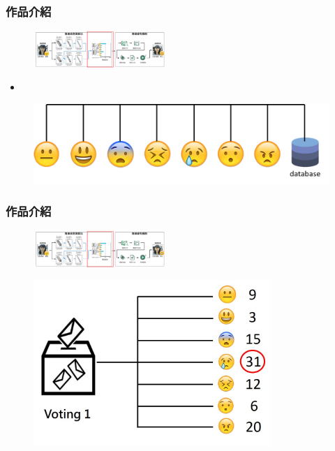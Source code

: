 \documentclass[10pt, conference, compsocconf]{beamer}
\begin{document}
\begin{CJK}{UTF8}{}
\begin{frame}
\frametitle{作品介紹}
\begin{figure}[t]
\begin{flushright}
\includegraphics[width=5cm]{./Figures/framework3.pdf}
\end{flushright}
\end{figure}

\vspace{-5mm}

\begin{itemize}
\item {}
\end{itemize}

\vspace{5mm}
\begin{figure}[!t]
\begin{center}
\includegraphics[width=12.3cm]{./Figures/501.png}
\end{center}
\end{figure}

\end{frame}

\begin{frame}
\frametitle{作品介紹}
\begin{figure}[t]
\begin{flushright}
\includegraphics[width=5cm]{./Figures/framework3.pdf}
\end{flushright}
\end{figure}

\vspace{-5mm}
\begin{figure}[!t]
\begin{center}
\includegraphics[width=9cm]{./Figures/502.jpg}
\end{center}
\end{figure}


\end{frame}
\end{CJK}
\end{document}
